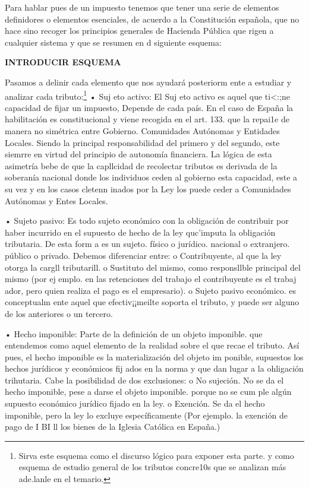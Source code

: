 \documentclass[10pt,a4paper]{article}
\begin{document}
{Para hablar pues de un impuesto tenemos que tener una serie de elementos definidores o elementos esenciales, de acuerdo a la Constitución española, que no hace sino recoger los principios generales de Hacienda Pública que rigen a cualquier sistema y que se resumen en d siguiente esquema:

\textbf{INTRODUCIR ESQUEMA}

Pasamos a delinir cada elemento que nos ayudará posteriorm ente a estudiar y analizar cada tributo:\footnote{%
    Sirva este esquema como el discurso lógico para exponer esta parte. y como esquema de estudio general de los tributos concre10s que se analizan más ade.lanle en el temario.
}
• Suj eto activo: El Suj eto activo es aquel que ti<:;ne capacidad de fijar un impuesto, Depende de cada país. En el caso de España la habilitación es constitucional y viene recogida en el art. 133. que la repai1e de manera no simétrica entre Gobierno. Comunidades Autónomas y Entidades Locales. Siendo la principal responsabilidad del primero y del segundo, este siemrre en virtud del principio de autonomía financiera. La lógica de esta asimetría bebe de que la capllcidad de recolectar tributos es derivada de la soberanía nacional donde los individuos ceden al gobierno esta capacidad, este a su vez y en los casos cletenn inados por la Ley los puede ceder a Comunidades Autónomas y Entes Locales.

• Sujeto pasivo: Es todo sujeto económico con la obligación de contribuir por haber incurrido en el supuesto de hecho de la ley quc'imputa la obligación tributaria. De esta form a es un sujeto. físico o jurídico. nacional o extranjero. público o privado. Debemos diferenciar entre: o Contribuyente, al que la ley otorga la cargll tributarill. o Sustituto del mismo, como responsllble principal del mismo (por ej emplo. en las retenciones del trabajo el contribuyente es el trabaj ador, pero quien realiza el pago es el empresario). o Sujeto pasivo económico. es conceptualm ente aquel que efectiv¡¡meilte soporta el tributo, y puede ser alguno de los anteriores o un tercero.

• Hecho imponible: Parte de la definición de un objeto imponible. que entendemos como aquel elemento de la realidad sobre el que recae el tributo. Así pues, el hecho imponible es la materialización del objeto im ponible, supuestos los hechos jurídicos y económicos fij ados en la norma y que dan lugar a la ohligación trihutaria. Cabe la posibilidad de dos exclusiones: o No sujeción. No se da el hecho imponible, pese a darse el objeto imponible. porque no se cum ple algún supuesto económico jurídico fijado en la ley. o Exención. Se da el hecho imponible, pero la ley lo excluye específicamente (Por ejemplo. la exención de pago de I BI ll los bienes de la Iglesia Católica en España.)

}
\end{document}
